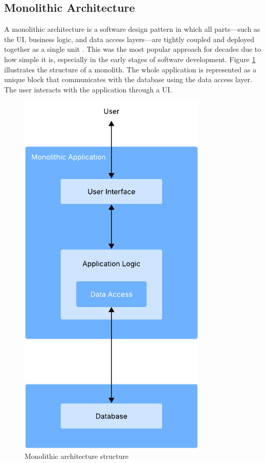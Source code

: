 \subsection{Monolithic Architecture}
A monolithic architecture is a software design pattern in which all parts---such
as the \gls{UI}, business logic, and data access layers---are tightly
coupled and deployed together as a single unit \cite{7436659}. This
was the most popular approach for decades due to how simple it is, especially in
the early stages of software development.
Figure \ref{fig:architectures:monolithic}
illustrates the structure of a monolith. The whole application is represented
as a unique block that communicates with the database using the data access
layer. The user interacts with the application through a \gls{UI}.
\begin{figure}[htbp]
	\centering
	\includegraphics[width=0.8\textwidth, height=0.5\textheight, keepaspectratio]{Chapters/Figures/Architectures/Monolith.pdf}
	\caption{Monolithic architecture structure}
	\label{fig:architectures:monolithic}
\end{figure}

